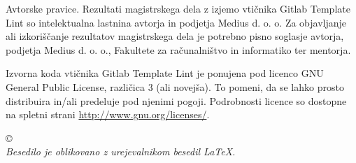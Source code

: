 \thispagestyle{empty}
\vspace*{\fill}
{\noindent\footnotesize


\vspace*{5cm}
{\small \noindent
{\sc Avtorske pravice}.
Rezultati magistrskega dela z izjemo vtičnika Gitlab Template Lint so intelektualna lastnina avtorja in podjetja Medius d. o. o. Za objavljanje ali izkoriščanje rezultatov ma\-gi\-str\-ske\-ga dela je potrebno pisno soglasje avtorja, podjetja Medius d. o. o., Fakultete za ra\-ču\-nal\-niš\-tvo in informatiko ter mentorja.
}





\vspace*{1.5cm}
{\small \noindent
Izvorna koda vtičnika Gitlab Template Lint je ponujena pod licenco GNU General Public License,
različica 3 (ali novejša). To pomeni, da se lahko prosto distribuira in/ali predeluje pod njenimi pogoji.
Podrobnosti licence so dostopne na spletni strani \url{http://www.gnu.org/licenses/}.
}


}
\begin{center}
{\footnotesize{\sc \copyright \myyear\ \tauthor}}
\ \\ \vfill
{\em
Besedilo je oblikovano z urejevalnikom besedil \LaTeX.}
\end{center}